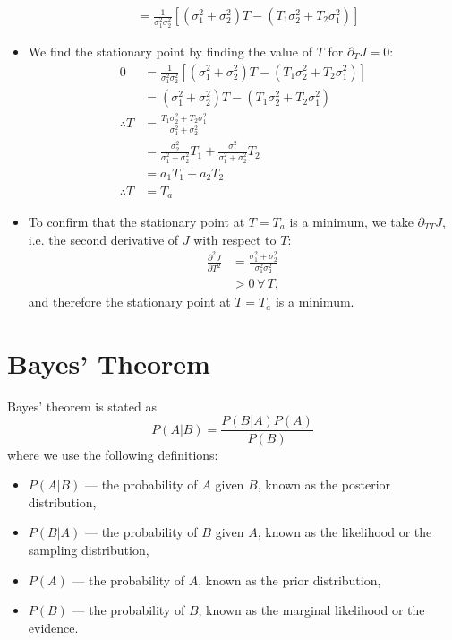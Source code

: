 \begin{itemize}
\begin{align}
        &= \frac{1}{\sigma_1^2 \sigma_2^2} \left[
            \left( \sigma_1^2 + \sigma_2^2 \right) T 
            - \left( T_1 \sigma_2^2 + T_2 \sigma_1^2 \right)
        \right]
    \end{align}
    \item We find the stationary point by finding the value of $T$ for $\partial_T J = 0$:
    \begin{align}
        0 &= \frac{1}{\sigma_1^2 \sigma_2^2} \left[
            \left( \sigma_1^2 + \sigma_2^2 \right) T 
            - \left( T_1 \sigma_2^2 + T_2 \sigma_1^2 \right)
        \right] \nonumber \\
            &= \left( \sigma_1^2 + \sigma_2^2 \right) T 
                - \left( T_1 \sigma_2^2 + T_2 \sigma_1^2 \right) \nonumber \\
        \therefore T &= \frac{T_1 \sigma_2^2 +T_2 \sigma_1^2}{\sigma_1^2 + \sigma_2^2} \nonumber \\
            &= \frac{\sigma_2^2}{\sigma_1^2 + \sigma_2^2} T_1
                + \frac{\sigma_1^2}{\sigma_1^2 + \sigma_2^2} T_2 \nonumber \\
            &= a_1 T_1 + a_2 T_2 \nonumber \\
        \therefore T &= T_a  
    \end{align}
    \item To confirm that the stationary point at $T = T_a$ is a minimum, we take $\partial_{TT} J$, i.e. the second derivative of $J$ with respect to $T$:
    \begin{align*}
        \frac{\partial^2 J}{\partial T^2} &= \frac{\sigma_1^2 + \sigma_2^2}{\sigma_1^2 \sigma_2^2} \\
            &> 0 \, \forall \, T,
    \end{align*}
    and therefore the stationary point at $T = T_a$ is a minimum.
\end{itemize}

\section{Bayes' Theorem}
\label{sec:kalnay_working:cost}

Bayes' theorem is stated as
\begin{equation}
    P \left( A | B \right)
    =
    \frac{P \left( B | A \right) P \left( A \right)}{P \left( B \right)}\label{eq:bayes_th}
\end{equation}
where we use the following definitions:
\begin{itemize}
    \item $P \left( A | B \right)$ --- the probability of $A$ given $B$, known as the posterior distribution,
    \item $P \left( B | A \right)$ --- the probability of $B$ given $A$, known as the likelihood or the sampling distribution,
    \item $P \left( A \right)$ --- the probability of $A$, known as the prior distribution,
    \item $P \left( B \right)$ --- the probability of $B$, known as the marginal likelihood or the evidence.
\end{itemize}

